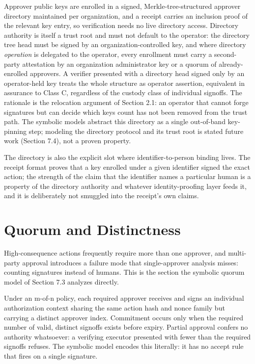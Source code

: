 \documentclass[11pt]{article}
\begin{document}
Approver public keys are enrolled in a signed, Merkle-tree-structured approver
directory maintained per organization, and a receipt carries an inclusion proof of
the relevant key entry, so verification needs no live directory access. Directory
authority is itself a trust root and must not default to the operator: the
directory tree head must be signed by an organization-controlled key, and where
directory \emph{operation} is delegated to the operator, every enrollment must
carry a second-party attestation by an organization administrator key or a quorum
of already-enrolled approvers. A verifier presented with a directory head signed
only by an operator-held key treats the whole structure as operator assertion,
equivalent in assurance to Class C, regardless of the custody class of individual
signoffs. The rationale is the relocation argument of Section 2.1: an operator
that cannot forge signatures but can decide which keys count has not been removed
from the trust path. The symbolic models abstract this directory as a single
out-of-band key-pinning step; modeling the directory protocol and its trust root
is stated future work (Section 7.4), not a proven property.

The directory is also the explicit slot where identifier-to-person binding lives.
The receipt format proves that a key enrolled under a given identifier signed the
exact action; the strength of the claim that the identifier names a particular
human is a property of the directory authority and whatever identity-proofing
layer feeds it, and it is deliberately not smuggled into the receipt's own claims.

\section{Quorum and Distinctness}

High-consequence actions frequently require more than one approver, and
multi-party approval introduces a failure mode that single-approver analysis
misses: counting signatures instead of humans. This is the section the symbolic
quorum model of Section 7.3 analyzes directly.

Under an m-of-n policy, each required approver receives and signs an individual
authorization context sharing the same action hash and nonce family but carrying a
distinct approver index. Commitment occurs only when the required number of valid,
distinct signoffs exists before expiry. Partial approval confers no authority
whatsoever: a verifying executor presented with fewer than the required signoffs
refuses. The symbolic model encodes this literally: it has no accept rule that
fires on a single signature.
\end{document}
